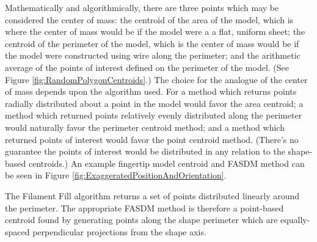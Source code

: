  Mathematically and algorithmically, there are three points which may be considered the center of mass: the centroid of the area of the model, which is where the center of mass would be if the model were a a flat, uniform sheet; the centroid of the perimeter of the model, which is the center of mass would be if the model were constructed using wire along the perimeter; and the arithmetic average of the points of interest defined on the perimeter of the model. (See Figure \ref{fig:RandomPolygonCentroids}.) The choice for the analogue of the center of mass depends upon the algorithm used. For a method which returns points radially distributed about a point in the model would favor the area centroid; a method which returned points relatively evenly distributed along the perimeter would naturally favor the perimeter centroid method; and a method which returned points of interest would favor the point centroid method. (There's no guarantee the points of interest would be distributed in any relation to the shape-based centroids.) An example fingertip model centroid and FASDM method can be seen in Figure \ref{fig:ExaggeratedPositionAndOrientation}.
 
 The Filament Fill algorithm returns a set of points distributed linearly around the perimeter. The appropriate FASDM method is therefore a point-based centroid found by generating points along the shape perimeter which are equally-spaced perpendicular projections from the shape axis.

